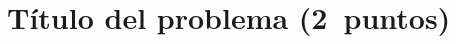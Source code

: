 \documentclass[11pt,a4paper,twoside,spanish,exam]{teaching}
\begin{document}


\section{Título del problema (2~puntos)}
\end{document}
